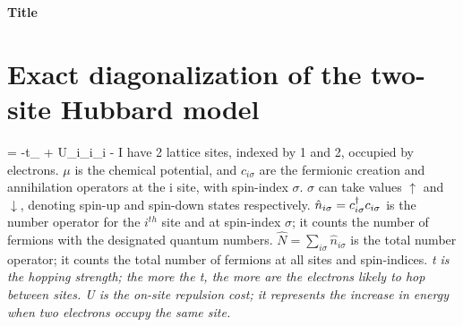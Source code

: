 \documentclass[12pt]{article}
\begin{document}
\begin{titlepage}
\begin{center}
\bf{\Large{Title}}\\
\end{center}

\end{titlepage}

\tableofcontents
\newpage

\section{Exact diagonalization of the two-site Hubbard model}

\beq
\ham = -t\sum_\sigma{} + U\sum_i_{i\uparrow}_{i\downarrow} -\mu {}
\eeq
I have 2 lattice sites, indexed by 1 and 2, occupied by electrons. \(\mu\) is the chemical potential,  and \(c_{i\sigma}\) are the fermionic creation and annihilation operators at the i site, with spin-index \(\sigma\). \(\sigma\) can take values \(\uparrow\) and \(\downarrow\), denoting spin-up and spin-down states respectively. \(\hat{n}_{i\sigma}=c_{{i}{\sigma}}^\dagger c_{{i}{\sigma}}\) is the number operator for the \(i^{th}\) site and at spin-index \(\sigma\); it counts the number of fermions with the designated quantum numbers. \(\hat{N}= \sum_{i\sigma}\hat{n}_{i\sigma}\) is the total number operator; it counts the total number of fermions at all sites and spin-indices. \it t is the hopping strength; the more the t, the more are the electrons likely to hop between sites. \it U is the on-site repulsion cost; it represents the increase in energy when two electrons occupy the same site.
\end{document}
